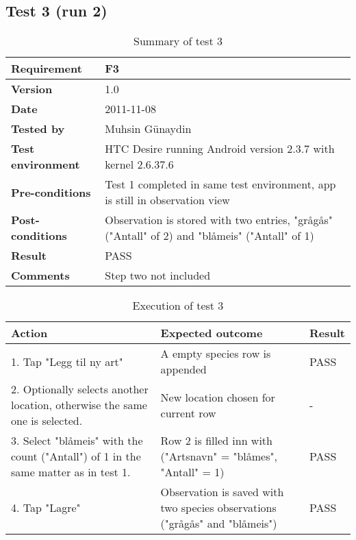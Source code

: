 \newpage
\subsection*{Test 3 (run 2)}

	\begin{table}[htb]
		\centering
		\begin{tabular}{|p{3.5cm}|p{7.0cm}|} \hline
			\textbf{Requirement} & F3 \\ \hline
			\textbf{Version} & 1.0 \\ \hline
			\textbf{Date} & 2011-11-08 \\ \hline
			\textbf{Tested by} & Muhsin Günaydin \\ \hline
			\textbf{Test environment} & HTC Desire running Android version 2.3.7 with kernel 2.6.37.6 \\ \hline
			\textbf{Pre-conditions} & Test 1 completed in same test environment, app is still in observation view \\ \hline
			\textbf{Post-conditions} & Observation is stored with two entries, "grågås" ("Antall" of 2) and "blåmeis" ("Antall" of 1) \\ \hline
			\textbf{Result} & PASS \\ \hline
			\textbf{Comments} & Step two not included  \\ \hline
		\end{tabular}
		\caption{Summary of test 3}
	\end{table}

	\begin{table}[htb]
		\centering
		\begin{tabular}{|p{5.0cm}|p{5.0cm}|p{1cm}|}
			\hline \textbf{Action} & \textbf{Expected outcome} & \textbf{Result} \\ \hline

			1. Tap "Legg til ny art" &
			A empty species row is appended &
			PASS \\ \hline
			
			2. Optionally selects another location, otherwise the same one is
			selected. & 
			New location chosen for current row &
			- \\ \hline

			3. Select "blåmeis" with the count ("Antall") of 1 in the same matter 
			as in test 1. &
			Row 2 is filled inn with ("Artsnavn" = "blåmes", "Antall" = 1) &
			PASS \\ \hline

			4. Tap "Lagre" &
			Observation is saved with two species observations ("grågås" and "blåmeis") &
			PASS \\ \hline
		\end{tabular}
		\caption{Execution of test 3}
	\end{table}


